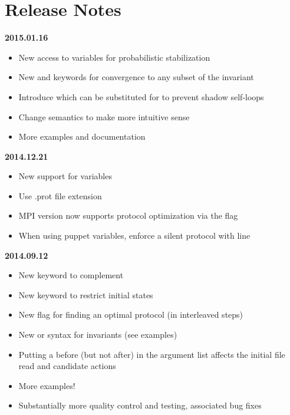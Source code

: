 
\section{Release Notes}

\textbf{2015.01.16}
\begin{itemize}
\item New  access to variables for probabilistic stabilization
\item New  and  keywords for convergence to any subset of the invariant
\end{itemize}
\begin{itemize}
\item Introduce  which can be substituted for  to prevent shadow self-loops
\item Change  semantics to make more intuitive sense
\item More examples and documentation
\end{itemize}
\textbf{2014.12.21}
\begin{itemize}
\item New support for  variables
\item Use .prot file extension
\item MPI version now supports protocol optimization via the  flag
\item When using puppet variables, enforce a silent protocol with  line
\end{itemize}
\textbf{2014.09.12}
\begin{itemize}
\item New  keyword to complement 
\item New  keyword to restrict initial states
\item New  flag for finding an optimal protocol (in interleaved steps)
\item New  or  syntax for invariants (see examples)
\item Putting a  before (but not after)  in the argument list affects the initial file read and candidate actions
\item More examples!
\item Substantially more quality control and testing, associated bug fixes
\end{itemize}
